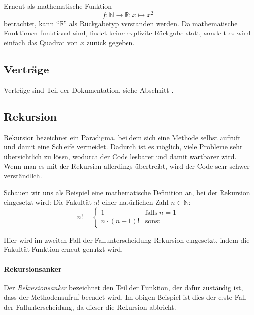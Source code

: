 		Erneut als mathematische Funktion \[ f : \underline{\mathbb{N}} \rightarrow \mathbb{R} : x \mapsto x ^ 2 \] betrachtet, kann \enquote{\(\mathbb{R}\)} als Rückgabetyp verstanden werden. Da mathematische Funktionen funktional sind, findet keine explizite Rückgabe statt, sondert es wird einfach das Quadrat von \(x\) zurück gegeben.

\subsection{Verträge} \functionalMark \imperativeMark \oopMark
	Verträge sind Teil der Dokumentation, siehe Abschnitt .

\subsection{Rekursion} \functionalMark \imperativeMark \oopMark

	
	Rekursion bezeichnet ein Paradigma, bei dem sich eine Methode selbst aufruft und damit eine Schleife vermeidet. Dadurch ist es möglich, viele Probleme sehr übersichtlich zu lösen, wodurch der Code lesbarer und damit wartbarer wird. Wenn man es mit der Rekursion allerdings übertreibt, wird der Code sehr schwer verständlich.
	
	Schauen wir uns als Beispiel eine mathematische Definition an, bei der Rekursion eingesetzt wird: Die Fakultät \( n! \) einer natürlichen Zahl \( n \in \mathbb{N} \):
	\begin{equation*}
		n! =
			\begin{cases}
				1                & \text{falls } n = 1 \\
				n \cdot (n - 1)! & \text{sonst}
			\end{cases}
	\end{equation*}
	
	Hier wird im zweiten Fall der Fallunterscheidung Rekursion eingesetzt, indem die Fakultät-Funktion erneut genutzt wird.
	
	\paragraph{Rekursionsanker}
		Der \textit{Rekursionsanker} bezeichnet den Teil der Funktion, der dafür zuständig ist, dass der Methodenaufruf beendet wird. Im obigen Beispiel ist dies der erste Fall der Fallunterscheidung, da dieser die Rekursion abbricht.
		
